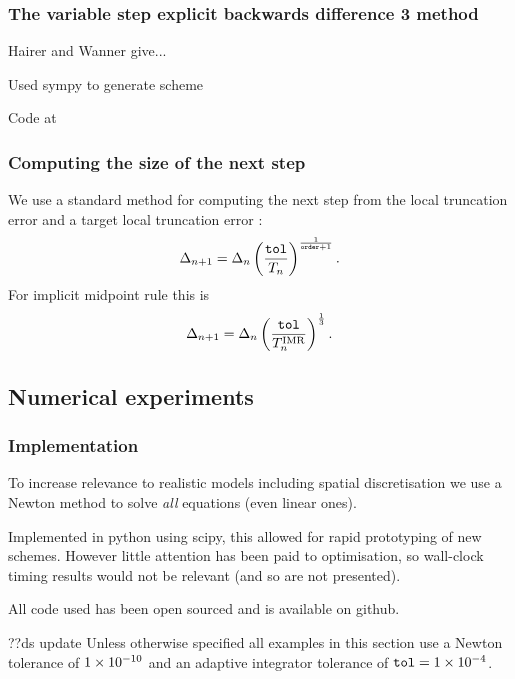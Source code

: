\subsubsection{The variable step explicit backwards difference 3 method}

Hairer and Wanner\cite{Hairer book} give...

Used sympy\cite{??ds sympy} to generate scheme

Code at \cite{??ds github}

\subsubsection{Computing the size of the next step}

We use a standard method for computing the next step from the local truncation error and a target local truncation error \toltt:\cite[pg.268]{Gresho-Sani}
\begin{equation}
\Delta_{n+1} = \Delta_{n} \left( \frac{{\textrm{\textup{\texttt{tol}}}}}{T_n}  \right) ^{\frac{1}{\texttt{order}+1}}.
\end{equation}
For implicit midpoint rule this is
\begin{equation}
  \Delta_{n+1} = \Delta_{n} \left( \frac{{\textrm{\textup{\texttt{tol}}}}}{T_n^{\text{IMR}}}  \right) ^{\frac{1}{3}}.
\end{equation}


\subsection{Numerical experiments}

\subsubsection{Implementation}

To increase relevance to realistic models including spatial discretisation we use a Newton method to solve \emph{all} equations (even linear ones).

Implemented in python using scipy, this allowed for rapid prototyping of new schemes. However little attention has been paid to optimisation, so wall-clock timing results would not be relevant (and so are not presented).

All code used has been open sourced and is available on github.\cite{simple-ode-github}


??ds update
Unless otherwise specified all examples in this section use a Newton tolerance of $1\times 10^{-10}$ and an adaptive integrator tolerance of ${\textrm{\textup{\texttt{tol}}}} = 1\times 10^{-4}$.


